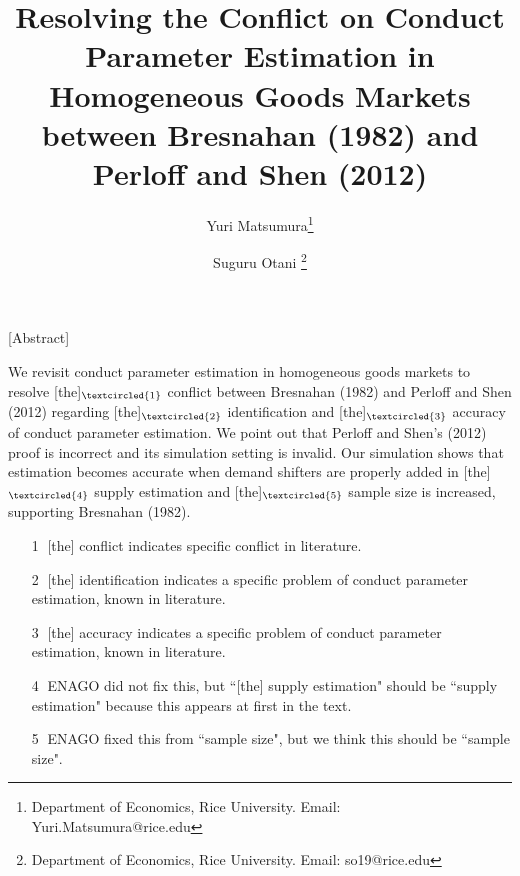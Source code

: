 \documentclass[11pt, a4paper]{article}
\title{Resolving the Conflict on Conduct Parameter Estimation in Homogeneous Goods Markets between Bresnahan (1982) and Perloff and Shen (2012)}
\author{Yuri Matsumura\thanks{Department of Economics, Rice University. Email: Yuri.Matsumura@rice.edu} \and Suguru Otani \thanks{Department of Economics, Rice University. Email: so19@rice.edu
}}
\begin{document}
\maketitle




[Abstract]

We revisit conduct parameter estimation in homogeneous goods markets to resolve [the]$_{\textcircled{1}}$ conflict between Bresnahan (1982) and Perloff and Shen (2012) regarding [the]$_{\textcircled{2}}$ identification and [the]$_{\textcircled{3}}$  accuracy of conduct parameter estimation. 
We point out that Perloff and Shen's (2012) proof is incorrect and its simulation setting is invalid.
Our simulation shows that estimation becomes accurate when demand shifters are properly added in [the]$_{\textcircled{4}}$ supply estimation and [the]$_{\textcircled{5}}$ sample size is increased, supporting Bresnahan (1982).

\begin{itemize}
    \item[\textcircled{1}] [the] conflict indicates specific conflict in literature. 
    \item[\textcircled{2}] [the] identification indicates a specific problem of conduct parameter estimation, known in literature. 
    \item[\textcircled{3}] [the] accuracy indicates a specific problem of conduct parameter estimation, known in literature. 
    \item[\textcircled{4}] ENAGO did not fix this, but ``[the] supply estimation" should be ``supply estimation" because this appears at first in the text.
    \item[\textcircled{5}] ENAGO fixed this from ``sample size", but we think this should be ``sample size".
\end{itemize}
\end{document}

